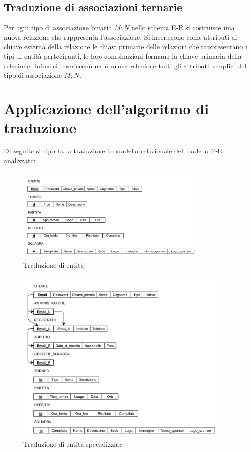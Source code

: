 \subsection{Traduzione di associazioni ternarie}
	Per ogni tipo di associazione binaria $M:N$ nello schema E-R si costruisce una nuova relazione che rappresenta l'associazione. Si inseriscono come attributi di chiave esterna della relazione le chiavi primarie delle relazioni che rappresentano i tipi di entità partecipanti, le loro combinazioni formano la chiave primaria della relazione. Infine si inseriscono nella nuova relazione tutti gli attributi semplici del tipo di associazione $M:N$.

\section{Applicazione dell'algoritmo di traduzione}
	Di seguito si riporta la traduzione in modello relazionale del modello E-R analizzato:
	
	\begin{figure}[h]
		\centering
		\includegraphics[width=0.85\textwidth]
		{immagini/traduzione-entita}
		
		\caption{Traduzione di entità}
	\end{figure}
	
	\begin{figure}[h]
		\centering
		\includegraphics[width=0.95\textwidth]
		{immagini/traduzione-entita-specializzate}
		
		\caption{Traduzione di entità specializzate}
	\end{figure}
	
